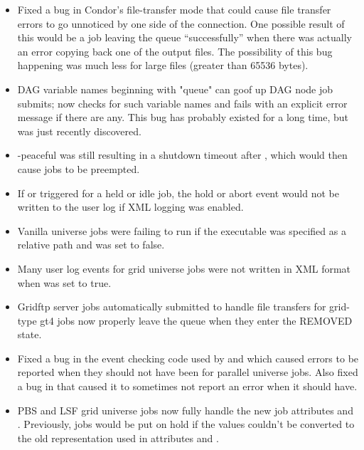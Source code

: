 \begin{itemize}
\item Fixed a bug in Condor's file-transfer mode that could cause file
transfer errors to go unnoticed by one side of the connection.  One
possible result of this would be a job leaving the queue
``successfully'' when there was actually an error copying back one of
the output files.  The possibility of this bug happening was much less
for large files (greater than 65536 bytes).

\item DAG variable names beginning with "queue" can goof up DAG node
job submits;  now checks for such variable names and
fails with an explicit error message if there are any.  This bug has
probably existed for a long time, but was just recently discovered.

\item {} -peaceful was still resulting in a shutdown timeout
after , which would then cause jobs
to be preempted.

\item If  or  triggered for a
held or idle job, the hold or abort event would not be written to the user
log if XML logging was enabled.

\item Vanilla universe jobs were failing to run if the executable was specified
as a relative path and  was set to false.

\item Many user log events for grid universe jobs were not written in XML
format when  was set to true.

\item Gridftp server jobs automatically submitted to handle file transfers
for grid-type gt4 jobs now properly leave the queue when they enter the
REMOVED state.

\item Fixed a bug in the event checking code used by 
and  which caused errors to be reported when
they should not have been for parallel universe jobs.  Also fixed
a bug in  that caused it to sometimes not
report an error when it should have.

\item PBS and LSF grid universe jobs now fully handle the new job 
attributes  and . Previously, jobs would 
be put on hold if the values couldn't be converted to the old 
representation used in attributes  and .


\end{itemize}

